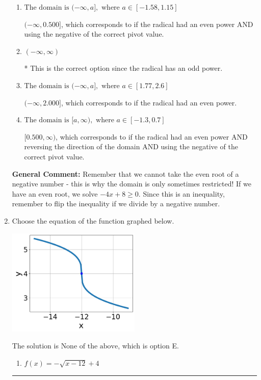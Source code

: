 \documentclass{extbook}[14pt]
\newcommand{\litem}[1]{\item #1

\rule{\textwidth}{0.4pt}}
\begin{document}
\begin{enumerate}
{\begin{enumerate}[label=\Alph*.]
$[2.000, \infty)$, which corresponds to if the radical had an even power AND reversing the direction of the domain.
\item \( \text{The domain is } (-\infty, a], \text{   where } a \in [-1.58, 1.15] \)

$(-\infty, 0.500]$, which corresponds to if the radical had an even power AND using the negative of the correct pivot value.
\item \( (-\infty, \infty) \)

* This is the correct option since the radical has an odd power.
\item \( \text{The domain is } (-\infty, a], \text{   where } a \in [1.77, 2.6] \)

$(-\infty, 2.000]$, which corresponds to if the radical had an even power.
\item \( \text{The domain is } [a, \infty), \text{   where } a \in [-1.3, 0.7] \)

$[0.500, \infty)$, which corresponds to if the radical had an even power AND reversing the direction of the domain AND using the negative of the correct pivot value.
\end{enumerate}

\textbf{General Comment:} Remember that we cannot take the even root of a negative number - this is why the domain is only sometimes restricted! If we have an even root, we solve $-4 x + 8 \geq 0$. Since this is an inequality, remember to flip the inequality if we divide by a negative number.
}
\litem{
Choose the equation of the function graphed below.

\begin{center}
    \includegraphics[width=0.5\textwidth]{../Figures/radicalGraphToEquationB.png}
\end{center}


The solution is \( \text{None of the above} \), which is option E.\begin{enumerate}[label=\Alph*.]
\item \( f(x) = - \sqrt{x - 12} + 4 \)


\end{enumerate}}
\end{enumerate}
\end{document}
